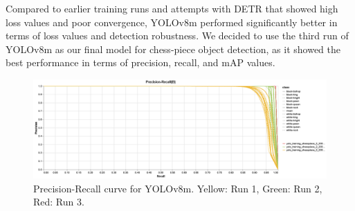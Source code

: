 Compared to earlier training runs and attempts with DETR that showed high loss values and poor convergence, YOLOv8m performed significantly better in terms of loss values and detection robustness.
We decided to use the third run of YOLOv8m as our final model for chess-piece object detection, as it showed the best performance in terms of precision, recall, and mAP values.

\begin{figure}[ht]
\centering
\includegraphics[width=\linewidth]{images/PR-runs-obj.png}
\caption{Precision-Recall curve for YOLOv8m. Yellow: Run 1, Green: Run 2, Red: Run 3. }
\label{fig:chess-detection}
\end{figure}
